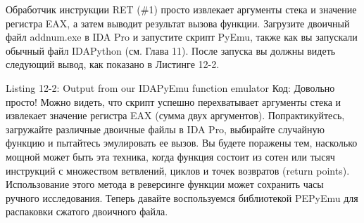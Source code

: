 \documentclass[12pt]{book}
\begin{document}

















Обработчик инструкции RET (\#1) просто извлекает аргументы стека и значение регистра EAX, а затем выводит результат вызова функции. Загрузите двоичный файл addnum.exe в IDA Pro и запустите скрипт PyEmu, также как вы запускали обычный файл IDAPython (см. Глава 11). После запуска вы должны видеть следующий вывод, как показано в Листинге 12-2.

Listing 12-2: Output from our IDAPyEmu function emulator
Код:
Довольно просто! Можно видеть, что скрипт успешно перехватывает аргументы стека и извлекает значение регистра EAX (сумма двух аргументов). Попрактикуйтесь, загружайте различные двоичные файлы в IDA Pro, выбирайте случайную функцию и пытайтесь эмулировать ее вызов. Вы будете поражены тем, насколько мощной может быть эта техника, когда функция состоит из сотен или тысяч инструкций с множеством ветвлений, циклов и точек возвратов (return points). Использование этого метода в реверсинге функции может сохранить часы ручного исследования. Теперь давайте воспользуемся библиотекой PEPyEmu для распаковки сжатого двоичного файла.
\end{document}
